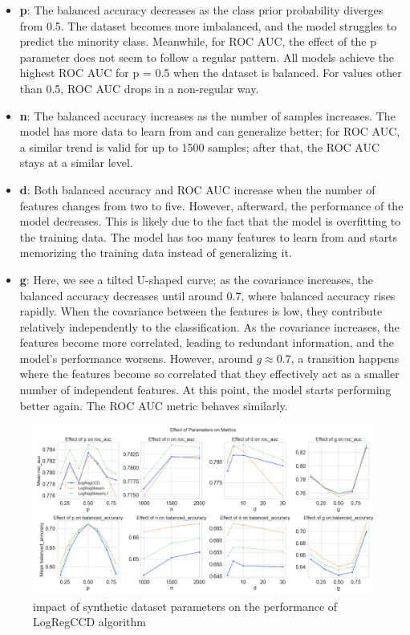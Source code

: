 \documentclass[11pt]{article}
\begin{document}
\begin{itemize}
    \item \textbf{p}: The balanced accuracy decreases as the class prior probability diverges from 0.5. The dataset becomes more imbalanced, and the model struggles to predict the minority class. Meanwhile, for ROC AUC, the effect of the p parameter does not seem to follow a regular pattern. All models achieve the highest ROC AUC for p = 0.5 when the dataset is balanced. For values other than 0.5, ROC AUC drops in a non-regular way.
    \item \textbf{n}: The balanced accuracy increases as the number of samples increases. The model has more data to learn from and can generalize better; for ROC AUC, a similar trend is valid for up to 1500 samples; after that, the ROC AUC stays at a similar level.
    \item \textbf{d}: Both balanced accuracy and ROC AUC increase when the number of features changes from two to five. However, afterward, the performance of the model decreases. This is likely due to the fact that the model is overfitting to the training data. The model has too many features to learn from and starts memorizing the training data instead of generalizing it.
    \item \textbf{g}: Here, we see a tilted U-shaped curve; as the covariance increases, the balanced accuracy decreases until around 0.7, where balanced accuracy rises rapidly. When the covariance between the features is low, they contribute relatively independently to the classification. As the covariance increases, the features become more correlated, leading to redundant information, and the model's performance worsens. However, around $g \approx 0.7$, a transition happens where the features become so correlated that they effectively act as a smaller number of independent features. At this point, the model starts performing better again. The ROC AUC metric behaves similarly.
    
\end{itemize}

\begin{figure}[h]
    \centering
  \includegraphics[width=\textwidth]{../results/parameter_facet_grid.png}
    \caption{impact of synthetic dataset parameters on the performance of LogRegCCD algorithm}
    \label{fig:synthetic-dataset-parameters}
  \end{figure}
\end{document}
